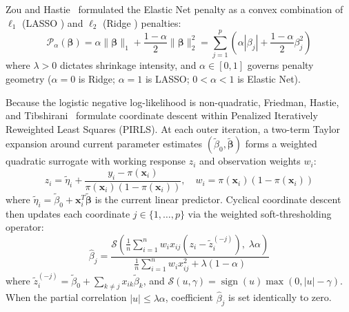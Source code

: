 \documentclass[11pt,oneside]{book}
\begin{document}
Zou and Hastie~\cite{zou2005regularization} formulated the Elastic Net penalty as a convex combination of $\ell_1$ (LASSO \cite{tibshirani1996regression}) and $\ell_2$ (Ridge \cite{hoerl1970ridge}) penalties:
\begin{equation}
\label{eq:elastic_net_penalty}
\mathcal{P}_\alpha(\boldsymbol{\beta}) = \alpha \|\boldsymbol{\beta}\|_1 + \frac{1 - \alpha}{2} \|\boldsymbol{\beta}\|_2^2 = \sum_{j=1}^p \left( \alpha |\beta_j| + \frac{1 - \alpha}{2} \beta_j^2 \right)
\end{equation}
where $\lambda > 0$ dictates shrinkage intensity, and $\alpha \in [0, 1]$ governs penalty geometry ($\alpha = 0$ is Ridge; $\alpha = 1$ is LASSO; $0 < \alpha < 1$ is Elastic Net).

Because the logistic negative log-likelihood is non-quadratic, Friedman, Hastie, and Tibshirani~\cite{friedman2010regularization} formulate coordinate descent within Penalized Iteratively Reweighted Least Squares (PIRLS). At each outer iteration, a two-term Taylor expansion around current parameter estimates $(\tilde{\beta}_0, \tilde{\boldsymbol{\beta}})$ forms a weighted quadratic surrogate with working response $z_i$ and observation weights $w_i$:
\begin{equation}
z_i = \tilde{\eta}_i + \frac{y_i - \pi(\mathbf{x}_i)}{\pi(\mathbf{x}_i)(1 - \pi(\mathbf{x}_i))}, \quad w_i = \pi(\mathbf{x}_i)(1 - \pi(\mathbf{x}_i))
\end{equation}
where $\tilde{\eta}_i = \tilde{\beta}_0 + \mathbf{x}_i^T \tilde{\boldsymbol{\beta}}$ is the current linear predictor. Cyclical coordinate descent then updates each coordinate $j \in \{1, \dots, p\}$ via the weighted soft-thresholding operator:
\begin{equation}
\hat{\beta}_j = \frac{\mathcal{S}\left( \frac{1}{n}\sum_{i=1}^n w_i x_{ij}(z_i - \tilde{z}_i^{(-j)}), \; \lambda \alpha \right)}{\frac{1}{n}\sum_{i=1}^n w_i x_{ij}^2 + \lambda(1 - \alpha)}
\end{equation}
where $\tilde{z}_i^{(-j)} = \tilde{\beta}_0 + \sum_{k \ne j} x_{ik}\tilde{\beta}_k$, and $\mathcal{S}(u, \gamma) = \operatorname{sign}(u) \max(0, |u| - \gamma)$. When the partial correlation $|u| \le \lambda \alpha$, coefficient $\hat{\beta}_j$ is set identically to zero.
\end{document}
